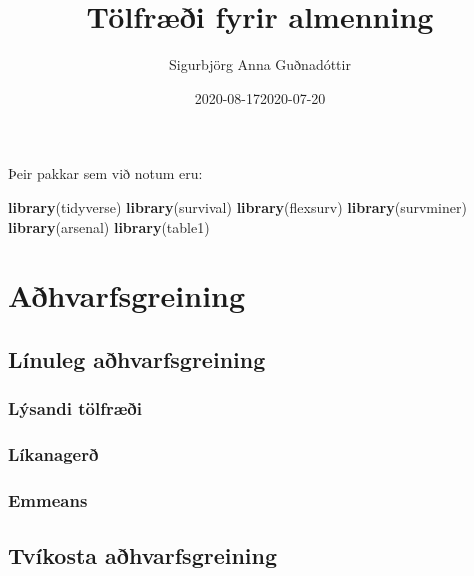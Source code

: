 \documentclass[
]{book}
\title{Tölfræði fyrir almenning}
\author{Sigurbjörg Anna Guðnadóttir}
\date{2020-08-17}
\date{2020-07-20}
\newenvironment{Shaded}{\begin{snugshade}}{\end{snugshade}}
\newcommand{\KeywordTok}[1]{\textcolor[rgb]{0.13,0.29,0.53}{\textbf{#1}}}
\newcommand{\NormalTok}[1]{#1}
\begin{document}
\maketitle

{
\setcounter{tocdepth}{1}
\tableofcontents
}
Þeir pakkar sem við notum eru:

\begin{Shaded}
\begin{Highlighting}[]
\KeywordTok{library}\NormalTok{(tidyverse)}
\KeywordTok{library}\NormalTok{(survival)}
\KeywordTok{library}\NormalTok{(flexsurv)}
\KeywordTok{library}\NormalTok{(survminer)}
\KeywordTok{library}\NormalTok{(arsenal)}
\KeywordTok{library}\NormalTok{(table1)}
\end{Highlighting}
\end{Shaded}

\hypertarget{reg}{%
\chapter{Aðhvarfsgreining}\label{reg}}

\hypertarget{luxednuleg-auxf0hvarfsgreining}{%
\section{Línuleg aðhvarfsgreining}\label{luxednuleg-auxf0hvarfsgreining}}

\hypertarget{luxfdsandi-tuxf6lfruxe6uxf0i}{%
\subsection{Lýsandi tölfræði}\label{luxfdsandi-tuxf6lfruxe6uxf0i}}

\hypertarget{luxedkanageruxf0}{%
\subsection{Líkanagerð}\label{luxedkanageruxf0}}

\hypertarget{emmeans}{%
\subsection{Emmeans}\label{emmeans}}

\hypertarget{tvuxedkosta-auxf0hvarfsgreining}{%
\section{Tvíkosta aðhvarfsgreining}\label{tvuxedkosta-auxf0hvarfsgreining}}
\end{document}
